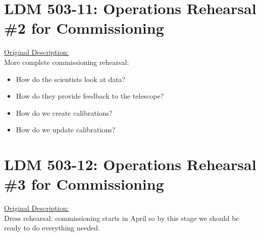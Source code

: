 %
%
%

\section{LDM 503-11: Operations Rehearsal \#2 for Commissioning}

\underline{Original Description:}\\
More complete commissioning rehearsal: 
\begin{itemize}
\item How do the scientists look at data? 
\item How do they provide feedback to the telescope?
\item How do we create calibrations?
\item How do we update calibrations?
\end{itemize}

%
%
%

\section{LDM 503-12: Operations Rehearsal \#3 for Commissioning}

\underline{Original Description:}\\
Dress rehearsal: commissioning starts in April so by this stage we should 
be ready to do everything needed.


